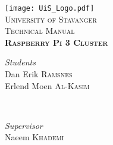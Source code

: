 \begin{titlepage} %
	\newcommand{\HRule}{\rule{\linewidth}{0.5mm}} %
	
	\center %
	
	
	\vfill
	\texttt{[image: UiS\_Logo.pdf]}\\[1cm] %
	\textsc{\LARGE University of Stavanger}\\[1.5cm] %
	
	
	\textsc{\Large Technical Manual}\\[1.5cm] %
	
	
	{\Huge\bfseries \textsc{Raspberry Pi 3 Cluster}}\\[3.0cm]
	
	
	\begin{minipage}{0.4\textwidth}
		\begin{flushleft}
			\large
			\textit{Students}\\
			Dan Erik \textsc{Ramsnes}\\
			Erlend Moen \textsc{Al-Kasim}
		\end{flushleft}
	\end{minipage}
	~
	\begin{minipage}{0.4\textwidth}
		\begin{flushright}
			\large
			\textit{Supervisor}\\
			Naeem \textsc{Khademi}\\
			\phantom{1pt}
		\end{flushright}
	\end{minipage}
	
	
	\vfill\vfill\vfill %
	\vfill %
	
\end{titlepage}